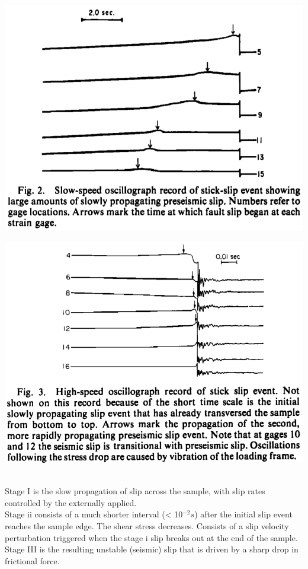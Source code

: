 \documentclass[aspectratio=43,9pt]{beamer}
\begin{document}
\begin{frame}{}
\vspace{20pt}
\begin{minipage}{0.45\linewidth}
  \includegraphics[width=1\linewidth]{Figs/figure_2.jpg}
\end{minipage}
\begin{minipage}{0.45\linewidth}
  \includegraphics[width=1\linewidth]{Figs/figure_3.jpg}
\end{minipage}\\
\vskip 0.2cm
{\small Stage I is the slow propagation of slip across the sample, with slip rates 
controlled by the externally applied.\\
\vskip 0.1cm
Stage ii consists of a much shorter interval (< 10$^{-2}s$)
after the initial slip event reaches the sample edge. The shear
stress decreases. Consists of a slip velocity perturbation triggered
when the stage i slip breaks out at the end of the sample. \\
\vskip 0.1cm
Stage III is the resulting unstable (seismic) slip that is driven by a sharp drop in frictional force.}


\end{frame}
\end{document}
